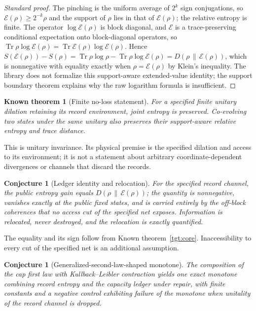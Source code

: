 \documentclass[11pt]{article}
\newtheorem{conjecture}[theorem]{Conjecture}
\newtheorem{known}[theorem]{Known theorem}
\theoremstyle{remark}
\newcommand{\KL}[2]{D\!\left(#1\,\middle\|\,#2\right)}
\newcommand{\Ent}{S}
\begin{document}
\begin{proof}[Standard proof]
The pinching is the uniform average of $2^k$ sign conjugations, so
$\mathcal E(\rho)\ge2^{-k}\rho$ and the support of $\rho$ lies in that of
$\mathcal E(\rho)$; the relative entropy is finite. The operator
$\log\mathcal E(\rho)$ is block diagonal, and $\mathcal E$ is a
trace-preserving conditional expectation onto block-diagonal operators, so
$\operatorname{Tr}\rho\log\mathcal E(\rho)=\operatorname{Tr}\mathcal E(\rho)
\log\mathcal E(\rho)$. Hence
$\Ent(\mathcal E(\rho))-\Ent(\rho)=\operatorname{Tr}\rho\log\rho
-\operatorname{Tr}\rho\log\mathcal E(\rho)=\KL{\rho}{\mathcal E(\rho)}$,
which is nonnegative with equality exactly when $\rho=\mathcal E(\rho)$ by
Klein's inequality. The library does not formalize this support-aware extended-value identity;
the support boundary theorem explains why the raw logarithm formula is insufficient.
\end{proof}

\begin{known}[Finite no-loss statement]
\label{tgt:noloss}
For a specified finite unitary dilation retaining its record environment,
joint entropy is preserved. Co-evolving two states under the same unitary
also preserves their support-aware relative entropy and trace distance.
\end{known}
This is unitary invariance. Its physical premise is the specified dilation
and access to its environment; it is not a statement about arbitrary
coordinate-dependent divergences or channels that discard the records.

\begin{conjecture}[Ledger identity and relocation]
\label{tgt:ledger}
For the specified record channel, the public entropy gain equals
$\KL{\rho}{\mathcal E(\rho)}$; the quantity is nonnegative, vanishes
exactly at the public fixed states, and is carried entirely by the off-block
coherences that no access cut of the specified net exposes. Information
is relocated, never destroyed, and the relocation is exactly quantified.
\end{conjecture}

The equality and its sign follow from Known theorem~\ref{tgt:core}.
Inaccessibility to every cut of the specified net is an additional assumption.

\begin{conjecture}[Generalized-second-law-shaped monotone]
The composition of the cap first law with Kullback--Leibler contraction
yields one exact monotone combining record entropy and the capacity
ledger under repair, with finite constants and a negative control
exhibiting failure of the monotone when unitality of the record channel
is dropped.
\end{conjecture}
\end{document}
